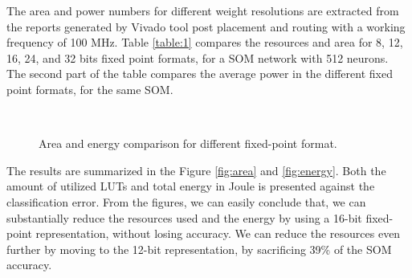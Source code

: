 The area and power numbers for different weight resolutions are extracted from the reports generated by Vivado tool post placement and routing with a working frequency of 100 MHz.
Table \ref{table:1} compares the resources and area for 8, 12, 16, 24, and 32 bits fixed point formats, for a SOM network with 512 neurons. The second part of the table compares the average power in the different fixed point formats, for the same SOM.

\begin{figure}[htb]
	\centering
	~
	\caption{ Area and energy comparison for different fixed-point format.}
	\label{fig:metrics}
\end{figure}
The results are summarized in the Figure \ref{fig:area} and \ref{fig:energy}. Both the amount of utilized LUTs and total energy in Joule is presented against the classification error. From the figures, we can easily conclude that, we can substantially reduce the resources used and the energy by using a 16-bit fixed-point representation, without losing accuracy. We can reduce the resources even further by moving to the 12-bit representation, by sacrificing 39\% of the SOM accuracy. 

